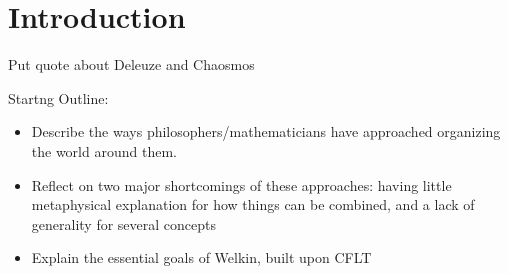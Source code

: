 

\chapter{Introduction}
\label{ch:intro}


\begin{displayquote}
Put quote about Deleuze and Chaosmos
\end{displayquote}

Startng Outline:
\begin{itemize}
  \item Describe the ways philosophers/mathematicians have approached organizing the world around them.
  \item Reflect on two major shortcomings of these approaches: having little metaphysical explanation for how things can be combined, and a lack of generality for several concepts
  \item Explain the essential goals of Welkin, built upon CFLT
\end{itemize}
